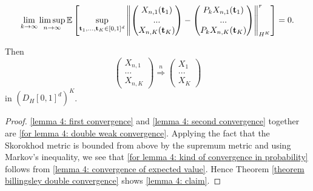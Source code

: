 \begin{lemma}
\begin{aufzii}
\begin{equation}
            \lim\limits_{k \to \infty} \limsup\limits_{n \to \infty} \mathbb{E}\left[\sup\limits_{\mathbf{t}_1, ..., \mathbf{t}_K \in [0, 1]^d} \left\| 
            \begin{pmatrix}X_{n, 1}(\mathbf{t}_1)\\...\\X_{n, K}(\mathbf{t}_K)\end{pmatrix}
            - \begin{pmatrix}P_k X_{n, 1}(\mathbf{t}_1)\\...\\P_k X_{n, K}(\mathbf{t}_K)\end{pmatrix} \right\|_{H^K}^r \right] = 0.
        \end{equation}
    \end{aufzii}
    Then
    \begin{equation} \label{lemma 4: claim}
        \begin{pmatrix}X_{n, 1}\\ ...\\ X_{n, K} \end{pmatrix} \stackrel{n}{\Rightarrow} \begin{pmatrix} X_1\\ ...\\ X_K \end{pmatrix}
    \end{equation}
    in $\left(D_H[0, 1]^d\right)^K$.
\end{lemma}
\begin{proof} 
    \eqref{lemma 4: first convergence} and \eqref{lemma 4: second convergence} together are \eqref{for lemma 4: double weak convergence}.
    Applying the fact that the Skorokhod metric is bounded from above by the supremum metric and using Markov's inequality, we see that \eqref{for lemma 4: kind of convergence in probability} follows from \eqref{lemma 4: convergence of expected value}. Hence Theorem \ref{theorem billingsley double convergence} shows \eqref{lemma 4: claim}.
\end{proof}
